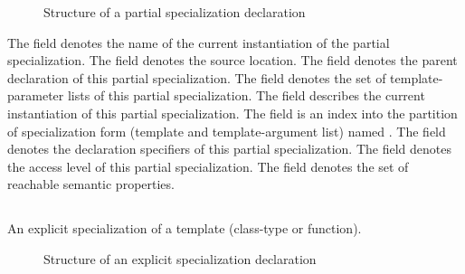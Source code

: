 %
\begin{figure}[H]
	\centering
	\caption{Structure of a partial specialization declaration}
	\label{fig:ifc-partial-specialization-decl-structure}
\end{figure}

The  field denotes the name of the current instantiation of the partial specialization.
The  field denotes the source location.
The  field denotes the parent declaration of this partial specialization.
The  field denotes the set of template-parameter lists of this partial specialization.
The  field describes the current instantiation of this partial specialization.
The  field is an index into the partition of specialization form (template and template-argument list) named .
The  field denotes the declaration specifiers of this partial specialization.
The  field denotes the access level of this partial specialization.
The  field denotes the set of reachable semantic properties.



\subsection{} 
\label{sec:ifc:DeclSort:ExplicitSpecialization}

An explicit specialization
of a template (class-type or function). 

\begin{figure}[H]
	\centering
	\caption{Structure of an explicit specialization declaration}
	\label{fig:ifc-explicit-specialization-declaration}
\end{figure}

